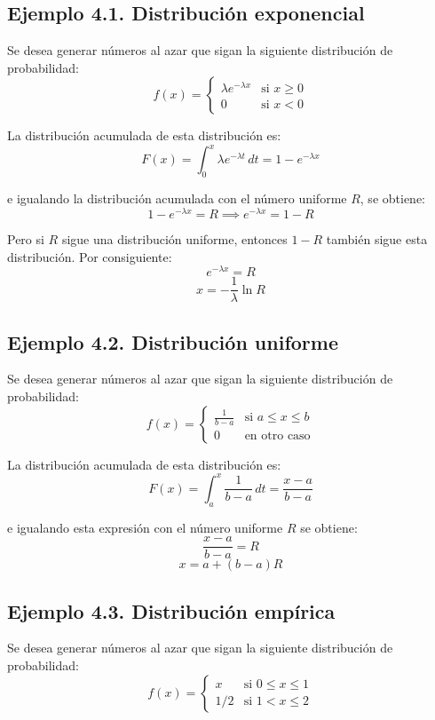 \documentclass[11pt,letterpaper]{report}
\begin{document}
\subsection*{Ejemplo 4.1. Distribución exponencial}
Se desea generar números al azar que sigan la siguiente distribución de probabilidad:
\[
f(x) = \begin{cases} 
\lambda e^{-\lambda x} & \text{si } x \ge 0 \\ 
0 & \text{si } x < 0 
\end{cases}
\]

La distribución acumulada de esta distribución es:
\begin{equation}
F(x) = \int_{0}^{x} \lambda e^{-\lambda t} \, dt = 1 - e^{-\lambda x}
\end{equation}

e igualando la distribución acumulada con el número uniforme $R$, se obtiene:
\[
1 - e^{-\lambda x} = R \implies e^{-\lambda x} = 1 - R
\]

Pero si $R$ sigue una distribución uniforme, entonces $1 - R$ también sigue esta distribución. Por consiguiente:
\[
e^{-\lambda x} = R
\]
\begin{equation}
x = -\frac{1}{\lambda} \ln R
\end{equation}

\subsection*{Ejemplo 4.2. Distribución uniforme}
Se desea generar números al azar que sigan la siguiente distribución de probabilidad:
\[
f(x) = \begin{cases} 
\frac{1}{b - a} & \text{si } a \le x \le b \\ 
0 & \text{en otro caso} 
\end{cases}
\]

La distribución acumulada de esta distribución es:
\begin{equation}
F(x) = \int_{a}^{x} \frac{1}{b - a} \, dt = \frac{x - a}{b - a}
\end{equation}

e igualando esta expresión con el número uniforme $R$ se obtiene:
\[
\frac{x - a}{b - a} = R
\]
\begin{equation}
x = a + (b - a)R
\end{equation}

\subsection*{Ejemplo 4.3. Distribución empírica}
Se desea generar números al azar que sigan la siguiente distribución de probabilidad:
\[
f(x) = \begin{cases} 
x & \text{si } 0 \le x \le 1 \\ 
1/2 & \text{si } 1 < x \le 2 
\end{cases}
\]
\end{document}

